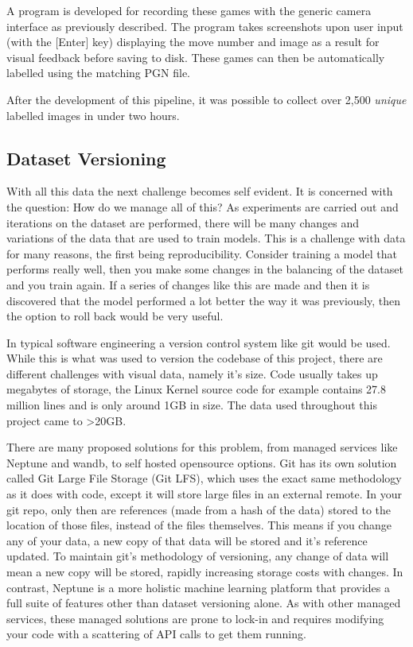A program is developed for recording these games with the generic camera interface
as previously described.  The program takes screenshots upon user input (with the
[Enter] key) displaying the move number and image as a result for visual feedback
before saving to disk.  These games can then be automatically labelled using the matching
PGN file.

After the development of this pipeline, it was possible to collect over 2,500 \textit{unique} labelled
images in under two hours.

\subsection{Dataset Versioning}
With all this data the next challenge becomes self evident. It is concerned with the question: How do we manage all of this?
As experiments are carried out and iterations on the dataset are performed, there will be many changes and variations of the data
that are used to train models.  This is a challenge with data for many reasons, the first being reproducibility.  Consider training a model
that performs really well, then you make some changes in the balancing of the dataset and you train again.  If a series of changes like this 
are made and then it is discovered that the model performed a lot better the way it was previously, then the option to roll back would be very useful.

In typical software engineering a version control system like git would be used.  While this is what was used to version the codebase of this project,
there are different challenges with visual data, namely it's size.  Code usually takes up megabytes of storage, the Linux Kernel source code for example contains
27.8 million lines and is only around 1GB in size.  The data used throughout this project came to >20GB.

There are many proposed solutions for this problem, from managed services like Neptune and wandb, to self hosted opensource options.  Git has its own
solution called Git Large File Storage (Git LFS), which uses the exact same methodology as it does with code, except it will store large files in an external 
remote.  In your git repo, only then are references (made from a hash of the data) stored to the location of those files, instead of the files themselves.  
This means if you change any of your data, a new copy 
of that data will be stored and it's reference updated.  To maintain git's methodology of versioning, any change of data will mean a new copy 
will be stored, rapidly increasing storage costs with changes.  In contrast, Neptune is a more holistic machine learning platform that provides a full suite of 
features other than dataset versioning alone.  As with other managed services, these managed solutions are prone to lock-in and requires modifying your code 
with a scattering of API calls to get them running.


